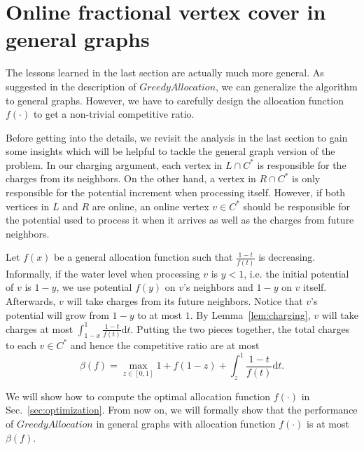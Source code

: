 \documentclass{article}
\begin{document}
%

\section{Online fractional vertex cover in general graphs}
The lessons learned in the last section are actually much more general. As suggested in the description of $GreedyAllocation$, we can generalize the algorithm to general graphs. However, we have to carefully design the allocation function $f(\cdot)$ to get a non-trivial competitive ratio.

Before getting into the details, we revisit the analysis in the last section to gain some insights which will be helpful to tackle the general graph version of the problem. In our charging argument, each vertex in $L\cap C^*$ is responsible for the charges from its neighbors. On the other hand, a vertex in $R\cap C^*$ is only responsible for the potential increment when processing itself. However, if both vertices in $L$ and $R$ are online, an online vertex $v\in C^*$ should be responsible for the potential used to process it when it arrives as well as the charges from future neighbors.

Let $f(x)$ be a general allocation function such that $\frac{1-t}{f(t)}$ is decreasing. Informally, if the water level when processing $v$ is $y<1$, i.e. the initial potential of $v$ is $1-y$, we use potential $f(y)$ on $v$'s neighbors and $1-y$ on $v$ itself. Afterwards, $v$ will take charges from its future neighbors. Notice that $v$'s potential will grow from $1-y$ to at most $1$. By Lemma~\ref{lem:charging}, $v$ will take charges at most $\int_{1-x}^1 \frac{1-t}{f(t)} \mathrm{d}t$. Putting the two pieces together, the total charges to each $v\in C^*$ and hence the competitive ratio are at most 
\[
\beta(f) = \max_{z\in [0,1]} 1 + f(1-z) + \int_{z}^1 \frac{1-t}{f(t)}\mathrm{d}t.
\]

We will show how to compute the optimal allocation function $f(\cdot)$ in Sec.~\ref{sec:optimization}. From now on, we will formally show that the performance of $GreedyAllocation$ in general graphs with allocation function $f(\cdot)$ is at most $\beta(f)$.
\end{document}
